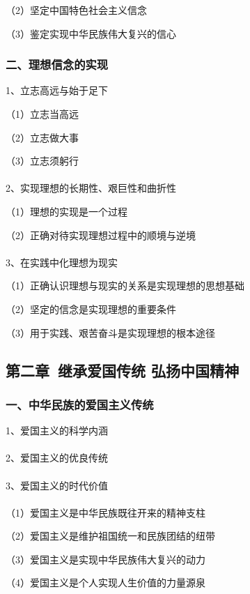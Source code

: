 \documentclass{ctexart}
\begin{document}
（2）坚定中国特色社会主义信念

（3）鉴定实现中华民族伟大复兴的信心

\subsubsection{二、理想信念的实现}

1、立志高远与始于足下

（1）立志当高远

（2）立志做大事

（3）立志须躬行
\\\\

2、实现理想的长期性、艰巨性和曲折性

（1）理想的实现是一个过程

（2）正确对待实现理想过程中的顺境与逆境
\\\\

3、在实践中化理想为现实

（1）正确认识理想与现实的关系是实现理想的思想基础

（2）坚定的信念是实现理想的重要条件

（3）用于实践、艰苦奋斗是实现理想的根本途径

\subsection{第二章\ 继承爱国传统 弘扬中国精神}

\subsubsection{一、中华民族的爱国主义传统}

1、爱国主义的科学内涵
\\\\

2、爱国主义的优良传统
\\\\

3、爱国主义的时代价值
\\\\	

（1）爱国主义是中华民族既往开来的精神支柱

（2）爱国主义是维护祖国统一和民族团结的纽带

（3）爱国主义是实现中华民族伟大复兴的动力

（4）爱国主义是个人实现人生价值的力量源泉
\end{document}
